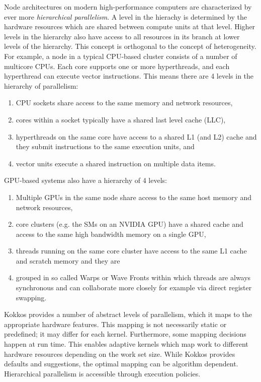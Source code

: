 Node architectures on modern high-performance computers are characterized by ever more \emph{hierarchical parallelism}. 
A level in the hierachy is determined by the hardware resources which are shared between compute units at that level. 
Higher levels in the hierarchy also have access to all resources in its branch at lower levels of the hierarchy.
This concept is orthogonal to the concept of heterogeneity. 
For example, a node in a typical CPU-based cluster consists of a number of multicore CPUs.  Each core supports one or more hyperthreads, and each hyperthread can execute vector instructions.
This means there are 4 levels in the hierarchy of parallelism: 
\begin{enumerate}
\item CPU sockets share access to the same memory and network resources,
\item cores within a socket typically have a shared last level cache (LLC), 
\item hyperthreads on the same core have access to a shared L1 (and L2) cache and they submit instructions to the same execution units, and
\item vector units execute a shared instruction on multiple data items.
\end{enumerate}
GPU-based systems also have a hierarchy of 4 levels:
\begin{enumerate}
\item Multiple GPUs in the same node share access to the same host memory and network resources, 
\item core clusters (e.g. the SMs on an NVIDIA GPU) have a shared cache and access to the same high bandwidth memory on a single GPU, 
\item threads running on the same core cluster have access to the same L1 cache and scratch memory and they are 
\item grouped in so called Warps or Wave Fronts within which threads are always synchronous and can collaborate more closely for example via direct register swapping. 
\end{enumerate}
Kokkos provides a number of abstract levels of parallelism,
which it maps to the appropriate hardware features.
This mapping is not necessarily static or predefined; it may differ for each kernel.
Furthermore, some mapping decisions happen at run time. 
This enables adaptive kernels which map work to different hardware resources depending on the work set size.
While Kokkos provides defaults and suggestions, the optimal mapping can be algorithm dependent. 
Hierarchical parallelism is accessible through execution policies.

